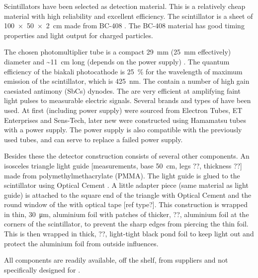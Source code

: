 Scintillators have been selected as detection material. This is a relatively cheap material with high reliability and excellent efficiency. The scintillator is a sheet of \SI[product-units=power]{100 x 50 x 2}{\centi\meter} made from BC-408 \cite{sgc2011bc408}. The BC-408 material has good timing properties and light output for charged particles.

The chosen photomultiplier tube \cite{et2010pmt} is a compact \SI{29}{\milli\meter} (\SI{25}{\milli\meter} effectively) diameter and \SI{~11}{\centi\meter} long (depends on the power supply) \pmt. The quantum efficiency of the biakali photocathode is \SI{25}{\percent} for the wavelength of maximum emission of the scintillator, which is \SI{425}{\nano\meter}. The \pmts contain a number of high gain caesiated antimony (SbCs) dynodes. The \pmts are very efficient at amplifying faint light pulses to measurable electric signals. Several brands and types of \pmts have been used. At first \pmts (including power supply) were sourced from Electron Tubes, ET Enterprises and Sens-Tech, later new \pmts were constructed using Hamamatsu tubes with a \nikhef power supply. The \nikhef power supply is also compatible with the previously used tubes, and can serve to replace a failed power supply.

Besides these the detector construction consists of several other components. An isosceles triangle light guide [measurements, base \SI{50}{\centi\meter}, legs ??, thickness ??] made from polymethylmethacrylate (PMMA). The light guide is glued to the scintillator using Optical Cement \cite{sgc2014bc600}. A little adapter piece (same material as light guide) is attached to the square end of the triangle with Optical Cement and the round window of the \pmt with optical tape [ref type?]. This construction is wrapped in thin, \SI{30}{\micro\meter}, aluminium foil with patches of thicker, ??, aluminium foil at the corners of the scintillator, to prevent the sharp edges from piercing the thin foil. This is then wrapped in thick, ??, light-tight black pond foil to keep light out and protect the aluminium foil from outside influences.

All components are readily available, off the shelf, from suppliers and not specifically designed for \hisparc.


